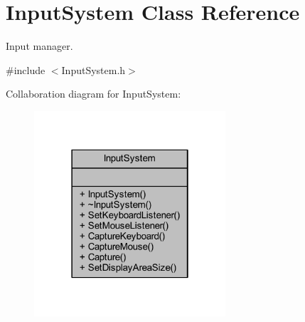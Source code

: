 \hypertarget{class_input_system}{\section{Input\-System Class Reference}
\label{class_input_system}
}


Input manager.  




{\ttfamily \#include $<$Input\-System.\-h$>$}



Collaboration diagram for Input\-System\-:\nopagebreak
\begin{figure}[H]
\begin{center}
\leavevmode
\includegraphics[width=202pt]{class_input_system__coll__graph}
\end{center}
\end{figure}
